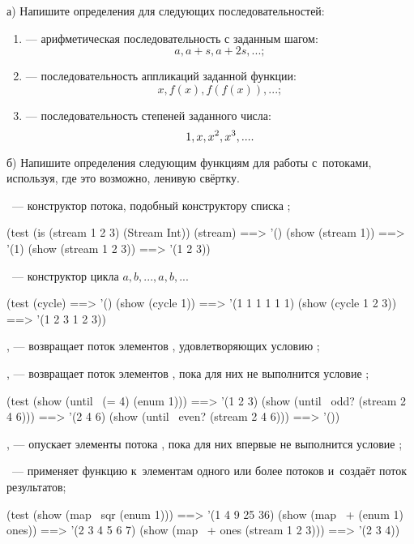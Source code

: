 \begin{Assignment}
а) Напишите определения для следующих последовательностей:
\begin{enumerate}
\item {} --- арифметическая последовательность с заданным шагом: $$a, a+s, a+2s, ...;$$
\item \label{iteration} --- последовательность аппликаций заданной функции: $$x, f(x), f(f(x)), ...;$$
\item {} --- последовательность степеней заданного числа: $$1, x, x^2 , x^3, ... .$$
\end{enumerate}


б) Напишите определения следующим функциям для работы с~потоками, используя, где это возможно, ленивую свёртку.

~--- конструктор потока, подобный конструктору списка ;
\begin{Specification}
(test 
  (is (stream 1 2 3) (Stream Int))
  (stream)              ==> '()
  (show (stream 1))     ==> '(1)
  (show (stream 1 2 3)) ==> '(1 2 3))
\end{Specification}

~--- конструктор цикла $a,b,...,a, b,...$
\begin{Specification}
(test 
  (cycle)              ==> '()
  (show (cycle 1))     ==> '(1 1 1 1 1 1)
  (show (cycle 1 2 3)) ==> '(1 2 3 1 2 3))
\end{Specification}


\label{lazy-filter}, --- возвращает поток элементов , удовлетворяющих условию ;

\label{until}, --- возвращает поток элементов , пока для них не выполнится условие ;

\begin{Specification}
(test
  (show (until~ (= 4) (enum 1)))        ==> '(1 2 3)
  (show (until~ odd? (stream 2 4 6)))   ==> '(2 4 6)
  (show (until~ even? (stream 2 4 6)))  ==> '())
\end{Specification}

\label{skip-until}, --- опускает элементы потока , пока для них впервые не выполнится условие ;

~--- применяет функцию  к~элементам одного или более потоков и~создаёт поток результатов;

\begin{Specification}
(test
  (show (map~ sqr (enum 1)))          ==> '(1 4 9 25 36)
  (show (map~ + (enum 1) ones))       ==> '(2 3 4 5 6 7)
  (show (map~ + ones (stream 1 2 3))) ==> '(2 3 4))
\end{Specification}
\end{Assignment}

